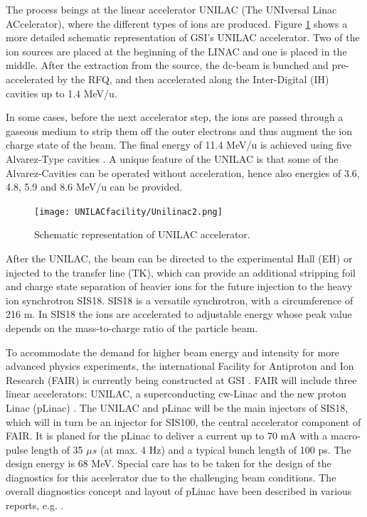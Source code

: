 The process beings at the linear accelerator UNILAC  (The UNIversal Linac ACcelerator), where the different types of ions are produced. Figure \ref{fig:UNILAC} shows a more detailed schematic representation of GSI's UNILAC accelerator. Two of the ion sources are placed at the beginning of the LINAC and one is placed in the middle. After the extraction from the source, the dc-beam is bunched and pre-accelerated by the RFQ, and then accelerated along the Inter-Digital (IH) cavities up to 1.4 MeV/u. 

In some cases, before the next accelerator step, the ions are passed through a gaseous medium to strip them off the outer electrons and thus augment the ion charge state of the beam. The final energy of 11.4 MeV/u is achieved using five Alvarez-Type cavities \parencite[]{ref:AlvarezCavity}. A unique feature of the UNILAC is that some of the Alvarez-Cavities can be operated without acceleration, hence also energies of 3.6, 4.8, 5.9 and 8.6 MeV/u can be provided. 

\begin{figure}[h]
    \centering
    \texttt{[image: UNILACfacility/Unilinac2.png]}
    \caption{Schematic representation of UNILAC accelerator.}
    \label{fig:UNILAC}
\end{figure}


After the UNILAC, the beam can be directed to the experimental Hall (EH) or injected to the transfer line (TK), which can provide an additional stripping foil and charge state separation of heavier ions for the future injection to the heavy ion synchrotron SIS18. SIS18 is a versatile synchrotron, with a circumference of 216 m. In SIS18 the ions are accelerated to adjustable energy whose peak value depends on the mass-to-charge ratio of the particle beam. 

To accommodate the demand for higher beam energy and intensity for more advanced physics experiments, the international Facility for Antiproton and Ion Research (FAIR) is currently being constructed at GSI \parencite*[]{ref:FAIR}. FAIR will include three linear accelerators: UNILAC, a superconducting cw-Linac \parencite*[]{ref:cwLinac} and the new proton Linac (pLinac) \parencite[][]{ref:pLinac}. The UNILAC and pLinac will be the main injectors of SIS18, which will in turn be an injector for SIS100, the central accelerator component of FAIR. It is planed for the pLinac to deliver a current up to 70 mA with a macro-pulse length of 35 $\mu s$ (at max. 4 Hz) and a typical bunch length of 100 ps. The design energy is 68 MeV. Special care has to be taken for the design of the diagnostics for this accelerator due to the challenging beam conditions. The overall diagnostics concept and layout of pLinac have been described in various reports, e.g. \parencite[][]{ref:InstruLinac}. 

